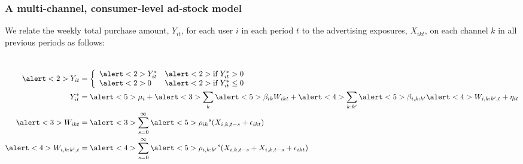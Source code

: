 \documentclass[10pt, aspectratio=169]{beamer}
\begin{document}
\begin{frame}[t]
\frametitle{A multi-channel, consumer-level ad-stock model}
We relate the weekly total purchase amount, $Y_{it}$, for each user $i$ in each period $t$ to the advertising exposures, $X_{ikt}$, on each channel $k$ in all previous periods as follows:
\begin{columns}
\begin{align*}
\alert<2>{Y_{it}} &= \left \{
\begin{array}{l l}
\alert<2>{Y^{\ast}_{it}} & \alert<2>{\text{if } Y^{\ast}_{it}>0}\\
\alert<2>{0} & \alert<2>{\text{if } Y^{\ast}_{it} \le 0} \\
\end{array}
\right . \\
Y^{\ast}_{it} &= \alert<5>{\mu_i} + \alert<3>{\sum_{k}\alert<5>{\beta_{ik}} W_{ikt}} + \alert<4>{\sum_{k:k'}\alert<5>{\beta_{i,k:k'}} \alert<4>{W_{i,k:k',t}}} +  \eta_{it} \\ %
\alert<3>{W_{ikt}} &= \alert<3>{\sum_{s=0}^{\infty}\alert<5>{\rho_{ik}}^s (X_{i,k,t-s} + \epsilon_{ikt})} \\
\alert<4>{W_{i,k:k',t}} &= \alert<4>{\sum_{s=0}^{\infty}\alert<5>{\rho_{i,k:k'}}^s (X_{i,k,t-s}+X_{i,k,t-s} + \epsilon_{ikt})} \\
\end{align*}
\footnotesize
{}
\end{columns}
\end{frame}
\end{document}
